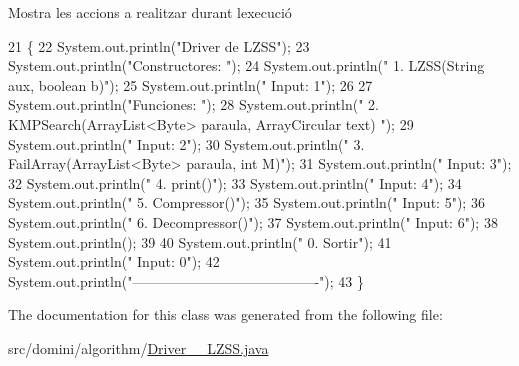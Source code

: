 Mostra les accions a realitzar durant l\textquotesingle{}execució 


\begin{DoxyCode}
21                                      \{
22         System.out.println(\textcolor{stringliteral}{"Driver de LZSS"});
23         System.out.println(\textcolor{stringliteral}{"Constructores: "});
24         System.out.println(\textcolor{stringliteral}{"     1. LZSS(String aux, boolean b)"});
25         System.out.println(\textcolor{stringliteral}{"     Input: 1"});
26 
27         System.out.println(\textcolor{stringliteral}{"Funciones: "});
28         System.out.println(\textcolor{stringliteral}{"     2. KMPSearch(ArrayList<Byte> paraula, ArrayCircular text) "});
29         System.out.println(\textcolor{stringliteral}{"     Input: 2"});
30         System.out.println(\textcolor{stringliteral}{"     3. FailArray(ArrayList<Byte> paraula, int M)"});
31         System.out.println(\textcolor{stringliteral}{"     Input: 3"});
32         System.out.println(\textcolor{stringliteral}{"     4. print()"});
33         System.out.println(\textcolor{stringliteral}{"     Input: 4"});
34         System.out.println(\textcolor{stringliteral}{"     5. Compressor()"});
35         System.out.println(\textcolor{stringliteral}{"     Input: 5"});
36         System.out.println(\textcolor{stringliteral}{"     6. Decompressor()"});
37         System.out.println(\textcolor{stringliteral}{"     Input: 6"});
38         System.out.println();
39 
40         System.out.println(\textcolor{stringliteral}{"     0. Sortir"});
41         System.out.println(\textcolor{stringliteral}{"     Input: 0"});
42         System.out.println(\textcolor{stringliteral}{"----------------------------------------"});
43     \}
\end{DoxyCode}


The documentation for this class was generated from the following file\+:\begin{DoxyCompactItemize}
\item 
src/domini/algorithm/\hyperlink{Driver____LZSS_8java}{Driver\+\_\+\+\_\+\+L\+Z\+S\+S.\+java}\end{DoxyCompactItemize}

